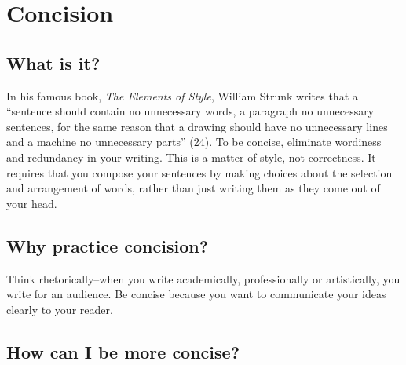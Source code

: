 \chapter{Concision}
 
\section{What is it?}
 
In his famous book, \emph{The Elements of Style}, William Strunk writes that a ``sentence should contain no unnecessary words, a paragraph no unnecessary sentences, for the same reason that a drawing should have no unnecessary lines and a machine no unnecessary parts'' (24). To be concise, eliminate wordiness and redundancy in your writing. This is a matter of style, not correctness. It requires that you compose your sentences by making choices about the selection and arrangement of words, rather than just writing them as they come out of your head.
 
\section{Why practice concision?}
 
Think rhetorically--when you write academically, professionally or artistically, you write for an audience. Be concise because you want to communicate your ideas clearly to your reader.
 
\section{How can I be more concise?}
 
